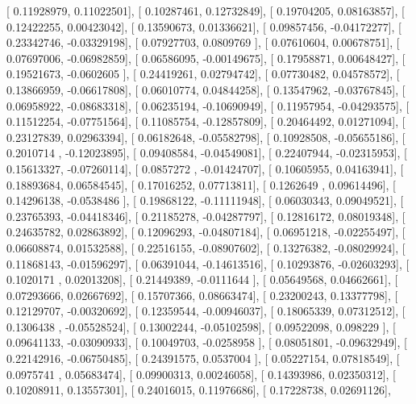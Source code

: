 \documentclass{article}
\begin{document}
       [ 0.11928979,  0.11022501],
       [ 0.10287461,  0.12732849],
       [ 0.19704205,  0.08163857],
       [ 0.12422255,  0.00423042],
       [ 0.13590673,  0.01336621],
       [ 0.09857456, -0.04172277],
       [ 0.23342746, -0.03329198],
       [ 0.07927703,  0.0809769 ],
       [ 0.07610604,  0.00678751],
       [ 0.07697006, -0.06982859],
       [ 0.06586095, -0.00149675],
       [ 0.17958871,  0.00648427],
       [ 0.19521673, -0.0602605 ],
       [ 0.24419261,  0.02794742],
       [ 0.07730482,  0.04578572],
       [ 0.13866959, -0.06617808],
       [ 0.06010774,  0.04844258],
       [ 0.13547962, -0.03767845],
       [ 0.06958922, -0.08683318],
       [ 0.06235194, -0.10690949],
       [ 0.11957954, -0.04293575],
       [ 0.11512254, -0.07751564],
       [ 0.11085754, -0.12857809],
       [ 0.20464492,  0.01271094],
       [ 0.23127839,  0.02963394],
       [ 0.06182648, -0.05582798],
       [ 0.10928508, -0.05655186],
       [ 0.2010714 , -0.12023895],
       [ 0.09408584, -0.04549081],
       [ 0.22407944, -0.02315953],
       [ 0.15613327, -0.07260114],
       [ 0.0857272 , -0.01424707],
       [ 0.10605955,  0.04163941],
       [ 0.18893684,  0.06584545],
       [ 0.17016252,  0.07713811],
       [ 0.1262649 ,  0.09614496],
       [ 0.14296138, -0.0538486 ],
       [ 0.19868122, -0.11111948],
       [ 0.06030343,  0.09049521],
       [ 0.23765393, -0.04418346],
       [ 0.21185278, -0.04287797],
       [ 0.12816172,  0.08019348],
       [ 0.24635782,  0.02863892],
       [ 0.12096293, -0.04807184],
       [ 0.06951218, -0.02255497],
       [ 0.06608874,  0.01532588],
       [ 0.22516155, -0.08907602],
       [ 0.13276382, -0.08029924],
       [ 0.11868143, -0.01596297],
       [ 0.06391044, -0.14613516],
       [ 0.10293876, -0.02603293],
       [ 0.1020171 ,  0.02013208],
       [ 0.21449389, -0.0111644 ],
       [ 0.05649568,  0.04662661],
       [ 0.07293666,  0.02667692],
       [ 0.15707366,  0.08663474],
       [ 0.23200243,  0.13377798],
       [ 0.12129707, -0.00320692],
       [ 0.12359544, -0.00946037],
       [ 0.18065339,  0.07312512],
       [ 0.1306438 , -0.05528524],
       [ 0.13002244, -0.05102598],
       [ 0.09522098,  0.098229  ],
       [ 0.09641133, -0.03090933],
       [ 0.10049703, -0.0258958 ],
       [ 0.08051801, -0.09632949],
       [ 0.22142916, -0.06750485],
       [ 0.24391575,  0.0537004 ],
       [ 0.05227154,  0.07818549],
       [ 0.0975741 ,  0.05683474],
       [ 0.09900313,  0.00246058],
       [ 0.14393986,  0.02350312],
       [ 0.10208911,  0.13557301],
       [ 0.24016015,  0.11976686],
       [ 0.17228738,  0.02691126],
\end{document}
